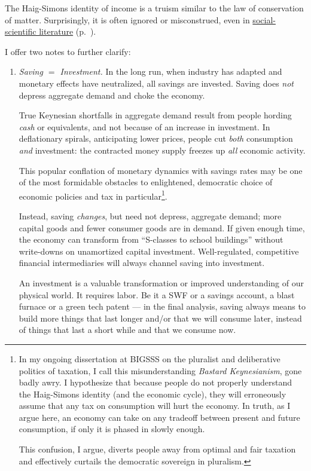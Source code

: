 The Haig-Simons identity of income is a truism similar to the law of conservation of matter. Surprisingly, it is often ignored or misconstrued, even in \hyperref[sec:Literature]{social-scientific literature} (p.~\pageref{sec:Literature}). %

I offer two notes to further clarify:
\begin{enumerate}
	\item \emph{Saving $=$ Investment.} In the long run, when industry has adapted and monetary effects have neutralized, all savings are invested. Saving does \emph{not} depress aggregate demand and choke the economy.

	True Keynesian shortfalls in aggregate demand result from people hording \emph{cash} or equivalents, and not because of an increase in investment. In deflationary spirals, anticipating lower prices, people cut \emph{both} consumption \emph{and} investment: the contracted money supply freezes up \emph{all} economic activity.

	This popular conflation of monetary dynamics with savings rates may be one of the most formidable obstacles to enlightened, democratic choice of economic policies and tax in particular\footnote{
		In my ongoing dissertation at \gls{BIGSSS} on the pluralist and deliberative politics of taxation, I call this misunderstanding \emph{Bastard Keynesianism}, gone badly awry. I hypothesize that because people do not properly understand the Haig-Simons identity (and the economic cycle), they will erroneously assume that any tax on consumption will hurt the economy. In truth, as I argue here, an economy can take on any tradeoff between present and future consumption, if only it is phased in slowly enough.

		This confusion, I argue, diverts people away from optimal and fair taxation and effectively curtails the democratic sovereign in pluralism.}.

	Instead, saving \emph{changes}, but need not depress, aggregate demand; more capital goods and fewer consumer goods are in demand. If given enough time, the economy can transform from ``S-classes to school buildings'' without write-downs on unamortized capital investment. Well-regulated, competitive financial intermediaries will always channel saving into investment.

	An investment is a valuable transformation or improved understanding of our physical world. It requires labor. Be it a \gls{SWF} or a savings account, a blast furnace or a green tech patent --- in the final analysis, saving always means to build more things that last longer and/or that we will consume later, instead of things that last a short while and that we consume now.


\end{enumerate}
